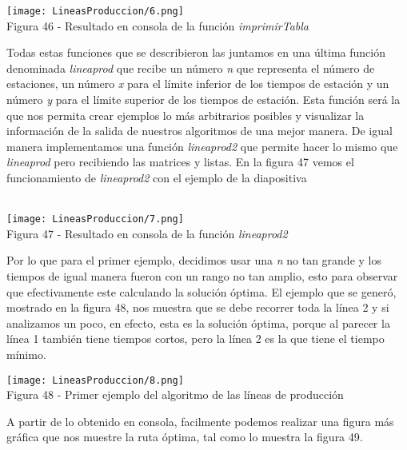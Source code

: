 \documentclass[12pt,twoside]{article}
\begin{document}
\begin{center}
    \texttt{[image: LineasProduccion/6.png]}\\
    Figura 46 - Resultado en consola de la función \textit{imprimirTabla}
\end{center}
Todas estas funciones que se describieron las juntamos en una última función denominada \textit{lineaprod} que recibe un número \textit{n} que representa el número de estaciones, un número \textit{x} para el límite inferior de los tiempos de estación y un número \textit{y} para el límite superior de los tiempos de estación. Esta función será la que nos permita crear ejemplos lo más arbitrarios posibles y visualizar la información de la salida de nuestros algoritmos de una mejor manera. De igual manera implementamos una función \textit{lineaprod2} que permite hacer lo mismo que \textit{lineaprod} pero recibiendo las matrices y listas. En la figura 47 vemos el funcionamiento de \textit{lineaprod2} con el ejemplo de la diapositiva\\\\
\begin{center}
    \texttt{[image: LineasProduccion/7.png]}\\
    Figura 47 - Resultado en consola de la función \textit{lineaprod2}
\end{center}
Por lo que para el primer ejemplo, decidimos usar una \textit{n} no tan grande y los tiempos de igual manera fueron con un rango no tan amplio, esto para observar que efectivamente este calculando la solución óptima. El ejemplo que se generó, mostrado en la figura 48, nos muestra que se debe recorrer toda la línea 2 y si analizamos un poco, en efecto, esta es la solución óptima, porque al parecer la línea 1 también tiene tiempos cortos, pero la línea 2 es la que tiene el tiempo mínimo.
\begin{center}
    \texttt{[image: LineasProduccion/8.png]}\\
    Figura 48 - Primer ejemplo del algoritmo de las líneas de producción
\end{center}
A partir de lo obtenido en consola, facilmente podemos realizar una figura más gráfica que nos muestre la ruta óptima, tal como lo muestra la figura 49.
\end{document}
